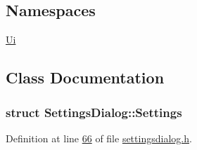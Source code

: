 \subsection*{Namespaces}
\begin{DoxyCompactItemize}
\item 
 \hyperlink{a00055}{Ui}
\end{DoxyCompactItemize}


\subsection{Class Documentation}
\label{dc/dfe/a00125}
\hypertarget{a00022_dc/dfe/a00125}{}
\subsubsection{struct Settings\+Dialog\+:\+:Settings}


Definition at line \hyperlink{a00045_source_l00066}{66} of file \hyperlink{a00045_source}{settingsdialog.\+h}.



